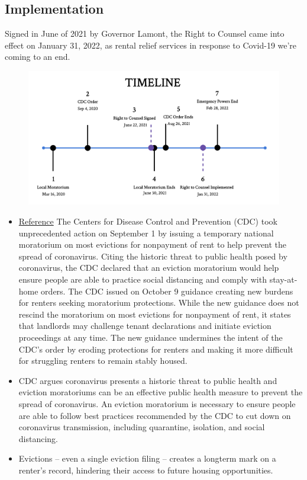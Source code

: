 \documentclass[a4paper,12pt]{article}
\begin{document}
\subsection{Implementation}
Signed in June of 2021 by Governor Lamont, the Right to Counsel came into effect on January 31, 2022, as rental relief services in response to Covid-19 we're coming to an end.
\par 
\begin{figure}[htbp]
\centering
    \centering
    \includegraphics[width=.60\linewidth]{figures/rtc/context/timeline.png}
    \label{SUBFIGURE LABEL 3}
\end{figure}
\begin{itemize}
    \item \href{https://nlihc.org/sites/default/files/Overview-of-National-Eviction-Moratorium.pdf}{Reference} The Centers for Disease Control and Prevention (CDC) took unprecedented action on September 1 by
issuing a temporary national moratorium on most evictions for nonpayment of rent to help prevent
the spread of coronavirus. Citing the historic threat to public health posed by coronavirus, the CDC
declared that an eviction moratorium would help ensure people are able to practice social distancing
and comply with stay-at-home orders. The CDC issued on October 9 guidance creating new burdens
for renters seeking moratorium protections. While the new guidance does not rescind the moratorium
on most evictions for nonpayment of rent, it states that landlords may challenge tenant declarations and
initiate eviction proceedings at any time. The new guidance undermines the intent of the CDC’s order by
eroding protections for renters and making it more difficult for struggling renters to remain stably housed.
\item CDC argues coronavirus presents a historic threat to public health and eviction
moratoriums can be an effective public health measure to prevent the spread of coronavirus. An eviction
moratorium is necessary to ensure people are able to follow best practices recommended by the CDC to
cut down on coronavirus transmission, including quarantine, isolation, and social distancing. 
\item Evictions – even a single eviction filing – creates a longterm mark on a renter’s record, hindering their access to future housing opportunities.
\end{itemize}
\end{document}
